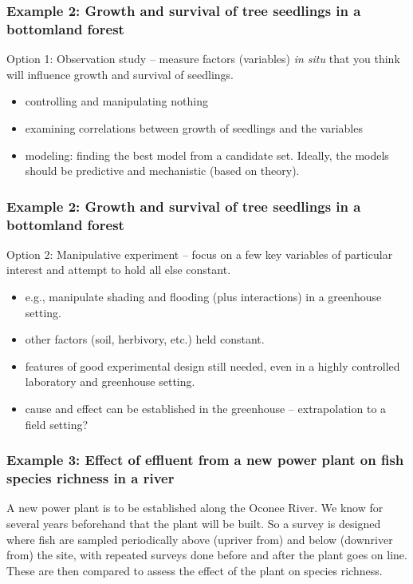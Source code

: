 \documentclass[color=usenames,dvipsnames]{beamer}\usepackage[]{graphicx}\usepackage[]{color}
\begin{document}
\begin{frame}
  \frametitle{Example 2: Growth and survival of
    tree seedlings in a bottomland forest}
  Option 1: Observation study -- measure factors (variables) {\it in
    situ} that you think will influence growth and survival of seedlings. 
  \begin{itemize}
    \item controlling and manipulating nothing
    \item examining correlations between growth of seedlings and
      the variables
    \item modeling: finding the best model from a candidate set. Ideally,
    the models should be predictive and mechanistic (based on theory).
  \end{itemize}
\end{frame}





\begin{frame}
  \frametitle{Example 2: Growth and survival of
    tree seedlings in a bottomland forest}
  Option 2: Manipulative experiment -- focus on a few key variables of
  particular interest and attempt to hold all else constant. 
  \begin{itemize}
    \item e.g., manipulate shading and flooding (plus interactions)
      in a greenhouse setting.
    \item other factors (soil, herbivory,
      etc.)  held constant.
    \item features of good experimental design
    still needed, even in a highly controlled laboratory and
    greenhouse setting.
    \item cause and effect can be established in
    the greenhouse – extrapolation to a field setting?
  \end{itemize}
\end{frame}





\begin{frame}
  \frametitle{Example 3: Effect of effluent from a new power plant on
    fish species richness in a river}
  A new power plant is to be established along the Oconee River.  We
  know for several years beforehand that the plant will be built.  So
  a survey is designed where fish are sampled periodically above
  (upriver from) and below (downriver from) the site, with repeated
  surveys done before and after the plant goes on line.  These are
  then compared to assess the effect of the plant on species richness.   
\end{frame}
\end{document}
